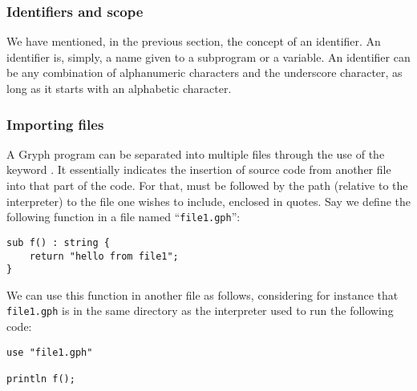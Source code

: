\subsubsection{Identifiers and scope}
\label{sec:idsandscope}
We have mentioned, in the previous section, the concept of an identifier. An identifier is, simply, a name given to a subprogram or a variable. An identifier can be any combination of alphanumeric characters and the underscore character, as long as it starts with an alphabetic character.

\subsubsection{Importing files}
A Gryph program can be separated into multiple files through the use of the keyword . It essentially indicates the insertion of source code from another file into that part of the code. For that,  must be followed by the path (relative to the interpreter) to the file one wishes to include, enclosed in quotes. Say we define the following function in a file named ``\texttt{file1.gph}'':
\begin{lstlisting}[language=Gryph]
sub f() : string {
	return "hello from file1";
}
\end{lstlisting}
We can use this function in another file as follows, considering for instance that \texttt{file1.gph} is in the same directory as the interpreter used to run the following code:
\begin{lstlisting}[language=Gryph]
use "file1.gph"

println f();
\end{lstlisting}